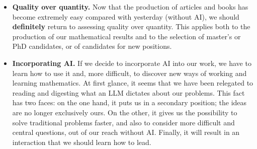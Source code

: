 \documentclass[12pt]{article}
\begin{document}
\begin{itemize}
\item\textbf{Quality over quantity.} Now that the production of articles and books has become extremely easy compared with yesterday (without AI), we should \textbf{definitely} return to assessing quality over quantity.
This applies both to the production of our mathematical results and to the selection of master's or PhD candidates,
or of candidates for new positions.
\item\textbf{Incorporating AI.} If we decide to incorporate AI into our work, we have to learn how to use it
and, more difficult, to discover new ways of working and learning mathematics.
At first glance, it seems that we have been relegated to reading and digesting what an LLM dictates about our problems.
This fact has two faces: on the one hand, it puts us in a secondary position; the ideas are no longer exclusively ours.
On the other, it gives us the possibility to solve traditional problems faster, and also to consider more difficult and central questions, out of our reach without AI.
Finally, it will result in an interaction that we should learn how to lead.


\end{itemize}
\end{document}
